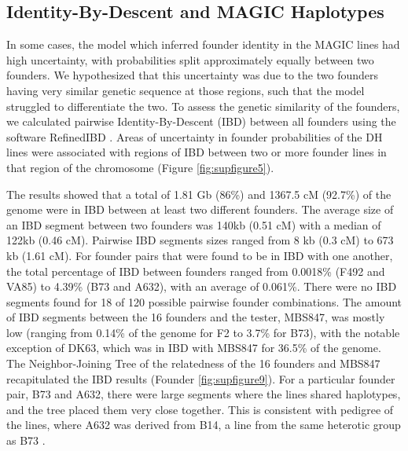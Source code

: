\documentclass[article,9pt,twocolumn,twoside]{rilabRxiv}
\newcommand{\jri}[1]{{\small \textcolor{red}{#1}}}
\begin{document}
\subsection{Identity-By-Descent and MAGIC Haplotypes}
In some cases, the model which inferred founder identity in the MAGIC lines had high uncertainty, with probabilities split approximately equally between two founders.
We hypothesized that this uncertainty was due to the two founders having very similar genetic sequence at those regions, such that the model struggled to differentiate the two.
To assess the genetic similarity of the founders, we calculated pairwise Identity-By-Descent (IBD) between all founders using the software RefinedIBD \citep{Browning}.
Areas of uncertainty in founder probabilities of the DH lines were associated with regions of IBD between two or more founder lines in that region of the chromosome (Figure \ref{fig:supfigure5}).

The results showed that a total of 1.81 Gb (86\%) and 1367.5 cM (92.7\%) of the genome were in IBD between at least two different founders. %
The average size of an IBD segment between two founders was 140kb (0.51 cM) with a median of 122kb (0.46 cM). Pairwise IBD segments sizes ranged from 8 kb (0.3 cM) to  673 kb (1.61 cM).
For founder pairs that were found to be in IBD with one another, the total percentage of IBD between founders ranged from 0.0018\% (F492 and VA85) to 4.39\% (B73 and A632), with an average of 0.061\%.
There were no IBD segments found for 18 of 120 possible pairwise founder combinations.
The amount of IBD segments between the 16 founders and the tester, MBS847, was mostly low (ranging from 0.14\% of the genome for F2 to 3.7\% for B73), with the notable exception of DK63, which was in IBD with MBS847 for 36.5\% of the genome.
The Neighbor-Joining Tree of the relatedness of the 16 founders and MBS847 recapitulated the IBD results (Founder \ref{fig:supfigure9}).
For a particular founder pair, B73 and A632, there were large segments where the lines shared haplotypes, and the tree placed them very close together.
This is consistent with pedigree of the lines, where A632 was derived from B14, a line from the same heterotic group as B73 \citep{Lorenz}.
\end{document}
